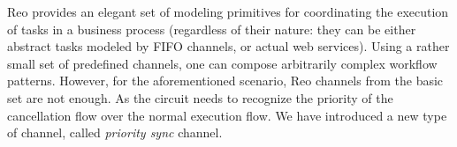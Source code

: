 Reo provides an elegant set of modeling primitives for coordinating the execution of tasks in a business process (regardless of their nature: they can be either abstract tasks modeled by FIFO channels, or actual web services). Using a rather small set of predefined channels, one can compose arbitrarily complex workflow patterns.  
However, for the aforementioned scenario, Reo channels from the basic set are not enough. As the circuit needs to recognize the priority of the cancellation flow over the normal execution flow. We have introduced a new type of channel, called \emph{priority sync} channel. 

